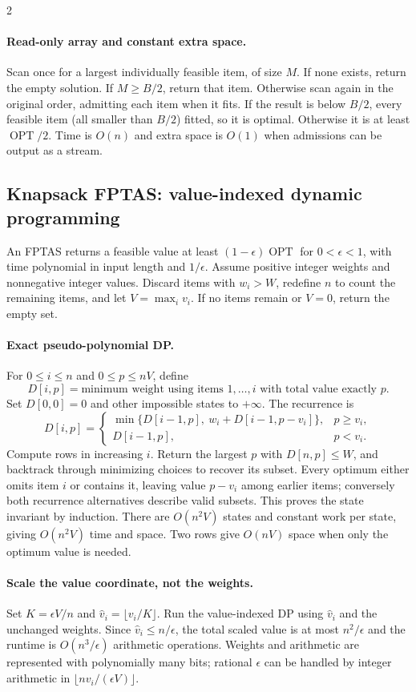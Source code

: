 \documentclass[10pt]{article}
\theoremstyle{definition}
\newcommand{\OPT}{\operatorname{OPT}}
\begin{document}
\begin{multicols*}{2}
\paragraph{Read-only array and constant extra space.}
Scan once for a largest individually feasible item, of size $M$. If none exists, return
the empty solution. If $M\ge B/2$, return that item. Otherwise scan again in the original
order, admitting each item when it fits. If the result is below $B/2$, every feasible item
(all smaller than $B/2$) fitted, so it is optimal. Otherwise it is at least $\OPT/2$.
Time is $O(n)$ and extra space is $O(1)$ when admissions can be output as a stream.

\subsection{Knapsack FPTAS: value-indexed dynamic programming}
\label{gre:fptas}
An FPTAS returns a feasible value at least $(1-\epsilon)\OPT$ for $0<\epsilon<1$, with
time polynomial in input length and $1/\epsilon$. Assume positive integer weights and
nonnegative integer values. Discard items with $w_i>W$, redefine $n$ to count the remaining
items, and let $V=\max_i v_i$. If no items remain or $V=0$, return the empty set.

\paragraph{Exact pseudo-polynomial DP.}
For $0\le i\le n$ and $0\le p\le nV$, define
\[
D[i,p]=\text{minimum weight using items }1,\ldots,i\text{ with total value exactly }p.
\]
Set $D[0,0]=0$ and other impossible states to $+\infty$. The recurrence is
\[
D[i,p]=
\begin{cases}
\min\{D[i-1,p],\ w_i+D[i-1,p-v_i]\},&p\ge v_i,\\
D[i-1,p],&p<v_i.
\end{cases}
\]
Compute rows in increasing $i$. Return the largest $p$ with $D[n,p]\le W$, and backtrack
through minimizing choices to recover its subset. Every optimum either omits item $i$ or
contains it, leaving value $p-v_i$ among earlier items; conversely both recurrence alternatives
describe valid subsets. This proves the state invariant by induction. There are $O(n^2V)$
states and constant work per state, giving $O(n^2V)$ time and space. Two rows give $O(nV)$
space when only the optimum value is needed.

\paragraph{Scale the value coordinate, not the weights.}
Set $K=\epsilon V/n$ and $\hat v_i=\lfloor v_i/K\rfloor$. Run the value-indexed DP using
$\hat v_i$ and the unchanged weights. Since $\hat v_i\le n/\epsilon$, the total scaled
value is at most $n^2/\epsilon$ and the runtime is $O(n^3/\epsilon)$ arithmetic operations.
Weights and arithmetic are represented with polynomially many bits; rational $\epsilon$
can be handled by integer arithmetic in $\lfloor nv_i/(\epsilon V)\rfloor$.


\end{multicols*}
\end{document}
